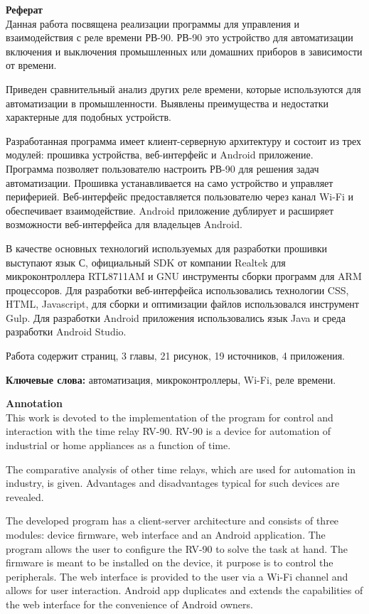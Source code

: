 \textbf{\Large Реферат} \\

Данная работа посвящена реализации программы для управления и взаимодействия с реле времени РВ-90. РВ-90 это устройство для автоматизации включения и выключения промышленных или домашних приборов в зависимости от времени.

Приведен сравнительный анализ других реле времени, которые используются для автоматизации в промышленности. Выявлены преимущества и недостатки характерные для подобных устройств.

Разработанная программа имеет клиент-серверную архитектуру и состоит из трех модулей: прошивка устройства, веб-интерфейс и Android приложение. Программа позволяет пользователю настроить РВ-90 для решения задач автоматизации. Прошивка устанавливается на само устройство и управляет периферией. Веб-интерфейс предоставляется пользователю через канал Wi-Fi и обеспечивает взаимодействие. Android приложение дублирует и расширяет возможности веб-интерфейса для владельцев Android.

В качестве основных технологий используемых для разработки прошивки выступают язык С, официальный SDK от компании Realtek для микроконтроллера RTL8711AM и GNU инструменты сборки программ для ARM процессоров. Для разработки веб-интерфейса использовались технологии CSS, HTML, Javascript, для сборки и оптимизации файлов использовался инструмент Gulp. Для разработки Android приложения использовались язык Java и среда разработки Android Studio.

Работа содержит \pageref{LastPage} страниц, 3 главы, 21 рисунок, 19 источников, 4 приложения.

\textbf{Ключевые слова:} автоматизация,  микроконтроллеры, Wi-Fi, реле времени.

\newpage

\textbf{\Large Annotation} \\

This work is devoted to the implementation of the program for control and interaction with the time relay RV-90. RV-90 is a device for automation of industrial or home appliances as a function of time.

The comparative analysis of other time relays, which are used for automation in industry, is given. Advantages and disadvantages typical for such devices are revealed.

The developed program has a client-server architecture and consists of three modules: device firmware, web interface and an Android application. The program allows the user to configure the RV-90 to solve the task at hand. The firmware is meant to be installed on the device, it purpose is to control the peripherals. The web interface is provided to the user via a Wi-Fi channel and allows for user interaction. Android app duplicates and extends the capabilities of the web interface for the convenience of Android owners.

